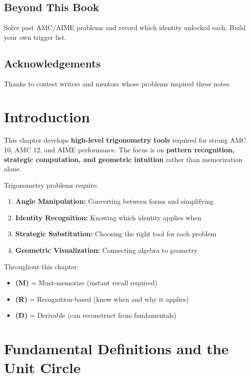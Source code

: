 \documentclass[12pt]{extarticle}
\begin{document}
\subsection*{Beyond This Book}
Solve past AMC/AIME problems and record which identity unlocked each. Build your own trigger list.

\subsection*{Acknowledgements}
Thanks to contest writers and mentors whose problems inspired these notes.

\newpage
\section*{Introduction}

This chapter develops \textbf{high-level trigonometry tools} required for strong AMC 10, AMC 12, and AIME performance. The focus is on \textbf{pattern recognition, strategic computation, and geometric intuition} rather than memorization alone.

\begin{conceptbox}
Trigonometry problems require:
\begin{enumerate}
    \item \textbf{Angle Manipulation:} Converting between forms and simplifying
    \item \textbf{Identity Recognition:} Knowing which identity applies when
    \item \textbf{Strategic Substitution:} Choosing the right tool for each problem
    \item \textbf{Geometric Visualization:} Connecting algebra to geometry
\end{enumerate}
\end{conceptbox}

Throughout this chapter:
\begin{itemize}
\item \textbf{(M)} = Must-memorize (instant recall required)
\item \textbf{(R)} = Recognition-based (know when and why it applies)
\item \textbf{(D)} = Derivable (can reconstruct from fundamentals)
\end{itemize}

\section{Fundamental Definitions and the Unit Circle}
\end{document}
